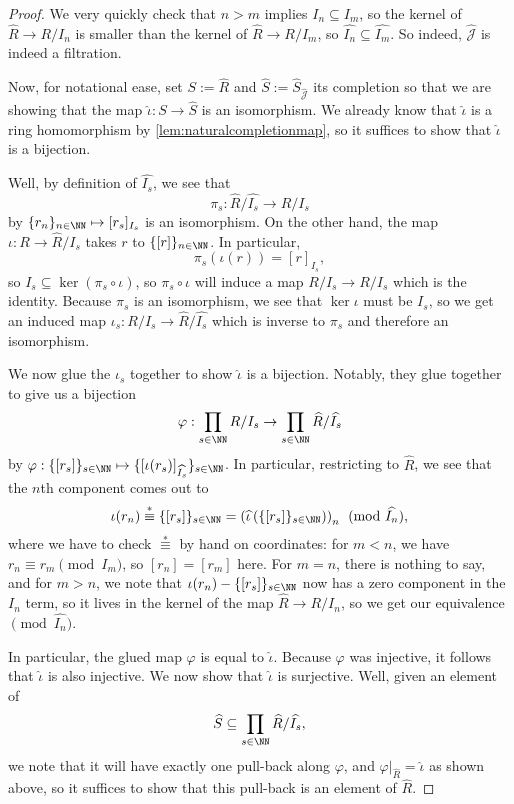 \begin{proof}
	We very quickly check that $n>m$ implies $I_n\subseteq I_m$, so the kernel of $\widehat R\to R/I_n$ is smaller than the kernel of $\widehat R\to R/I_m$, so $\widehat{I_n}\subseteq\widehat{I_m}$. So indeed, $\widehat{\mathcal J}$ is indeed a filtration.

	Now, for notational ease, set $S:=\widehat R$ and $\widehat S:=\widehat S_{\widehat{\mathcal J}}$ its completion so that  we are showing that the map $\widehat\iota:S\to\widehat S$ is an isomorphism. We already know that $\widehat\iota$ is a ring homomorphism by \autoref{lem:naturalcompletionmap}, so it suffices to show that $\widehat\iota$ is a bijection.

	Well, by definition of $\widehat{I_s}$, we see that
	\[\pi_s:\widehat R/\widehat{I_s}\to R/I_s\]
	by $\{r_n\}_{n\in\NN}\mapsto[r_s]_{I_s}$ is an isomorphism. On the other hand, the map $\iota:R\to\widehat R/\widehat{I_s}$ takes $r$ to $\{[r]\}_{n\in\NN}$. In particular,
	\[\pi_s(\iota(r))=[r]_{I_s},\]
	so $I_s\subseteq\ker(\pi_s\circ\iota)$, so $\pi_s\circ\iota$ will induce a map $R/I_s\to R/I_s$ which is the identity. Because $\pi_s$ is an isomorphism, we see that $\ker\iota$ must be $I_s$, so we get an induced map $\iota_s:R/I_s\to\widehat R/\widehat{I_s}$ which is inverse to $\pi_s$ and therefore an isomorphism.

	We now glue the $\iota_s$ together to show $\widehat\iota$ is a bijection. Notably, they glue together to give us a bijection
	\[\varphi:\prod_{s\in\NN}R/I_s\to\prod_{s\in\NN}\widehat R/\widehat{I_s}\]
	by $\varphi:\{[r_s]\}_{s\in\NN}\mapsto\{[\iota(r_s)]_{\widehat{I_s}}\}_{s\in\NN}$. In particular, restricting to $\widehat R$, we see that the $n$th component comes out to
	\[\iota(r_n)\stackrel*\equiv\{[r_s]\}_{s\in\NN}=\left(\widehat\iota\left(\{[r_s]\}_{s\in\NN}\right)\right)_n\pmod{\widehat{I_n}},\]
	where we have to check $\stackrel*\equiv$ by hand on coordinates: for $m<n$, we have $r_n\equiv r_m\pmod{I_m}$, so $[r_n]=[r_m]$ here. For $m=n$, there is nothing to say, and for $m>n$, we note that $\iota(r_n)-\{[r_s]\}_{s\in\NN}$ now has a zero component in the $I_n$ term, so it lives in the kernel of the map $\widehat R\to R/I_n$, so we get our equivalence$\pmod{\widehat{I_n}}$.

	In particular, the glued map $\varphi$ is equal to $\widehat\iota$. Because $\varphi$ was injective, it follows that $\widehat\iota$ is also injective. We now show that $\widehat\iota$ is surjective. Well, given an element of
	\[\widehat S\subseteq\prod_{s\in\NN}\widehat R/\widehat{I_s},\]
	we note that it will have exactly one pull-back along $\varphi$, and $\varphi|_{\widehat R}=\widehat\iota$ as shown above, so it suffices to show that this pull-back is an element of $\widehat R$.
	

\end{proof}
